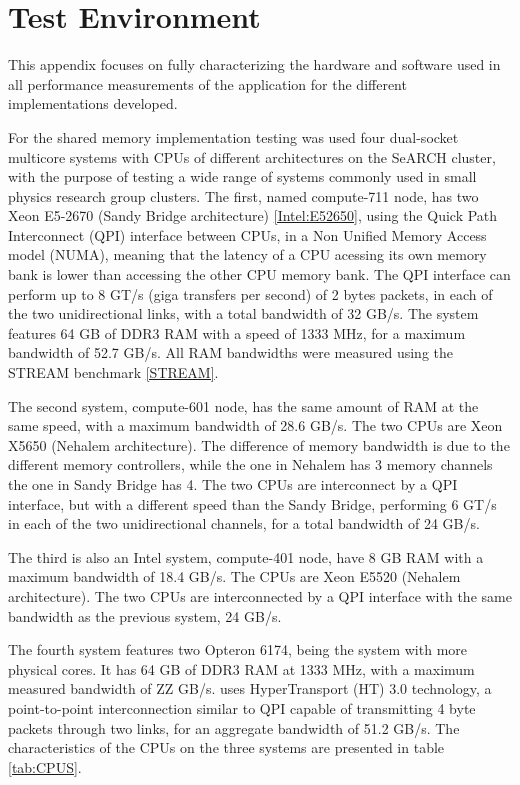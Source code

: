 \appendix
{}
\chapter{Test Environment}
\label{App:TestEnv}

This appendix focuses on fully characterizing the hardware and software used in all performance measurements of the application for the different implementations developed.

For the shared memory implementation testing was used four dual-socket multicore systems with CPUs of different architectures on the SeARCH cluster, with the purpose of testing a wide range of systems commonly used in small physics research group clusters. The first, named compute-711 node, has two \intel Xeon E5-2670 (Sandy Bridge architecture) \ref{Intel:E52650}, using the Quick Path Interconnect (QPI) interface between CPUs, in a Non Unified Memory Access model (NUMA), meaning that the latency of a CPU acessing its own memory bank is lower than accessing the other CPU memory bank. The QPI interface can perform up to 8 GT/s (giga transfers per second) of 2 bytes packets, in each of the two unidirectional links, with a total bandwidth of 32 GB/s. The system features 64 GB of DDR3 RAM with a speed of 1333 MHz, for a maximum bandwidth of 52.7 GB/s. All RAM bandwidths were measured using the STREAM benchmark \ref{STREAM}.

The second system, compute-601 node, has the same amount of RAM at the same speed, with a maximum bandwidth of 28.6 GB/s. The two CPUs are \intel Xeon X5650 (Nehalem architecture). The difference of memory bandwidth is due to the different memory controllers, while the one in Nehalem has 3 memory channels the one in Sandy Bridge has 4. The two CPUs are interconnect by a QPI interface, but with a different speed than the Sandy Bridge, performing 6 GT/s in each of the two unidirectional channels, for a total bandwidth of 24 GB/s.

The third is also an Intel system, compute-401 node, have 8 GB RAM with a maximum bandwidth of 18.4 GB/s. The CPUs are \intel Xeon E5520 (Nehalem architecture). The two CPUs are interconnected by a QPI interface with the same bandwidth as the previous system, 24 GB/s.

The fourth system features two \amd Opteron 6174, being the system with more physical cores. It has 64 GB of DDR3 RAM at 1333 MHz, with a maximum measured bandwidth of ZZ GB/s. \amd uses HyperTransport (HT) 3.0 technology, a point-to-point interconnection similar to QPI capable of transmitting 4 byte packets through two links, for an aggregate bandwidth of 51.2 GB/s. The characteristics of the CPUs on the three systems are presented in table \ref{tab:CPUS}.

